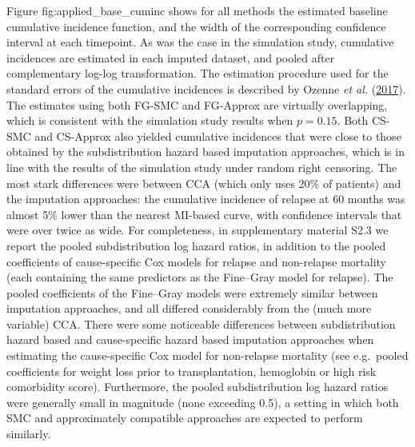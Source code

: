 \documentclass[
  letterpaper,
  DIV=11,
  numbers=noendperiod]{scrreprt}
\begin{document}
Figure fig:applied\_base\_cuminc shows for all methods the estimated
baseline cumulative incidence function, and the width of the
corresponding confidence interval at each timepoint. As was the case in
the simulation study, cumulative incidences are estimated in each
imputed dataset, and pooled after complementary log-log transformation.
The estimation procedure used for the standard errors of the cumulative
incidences is described by Ozenne \emph{et al.}
(\protect\hyperlink{ref-RJ-2017-062}{2017}). The estimates using both
FG-SMC and FG-Approx are virtually overlapping, which is consistent with
the simulation study results when \(p = 0.15\). Both CS-SMC and
CS-Approx also yielded cumulative incidences that were close to those
obtained by the subdistribution hazard based imputation approaches,
which is in line with the results of the simulation study under random
right censoring. The most stark differences were between CCA (which only
uses 20\% of patients) and the imputation approaches: the cumulative
incidence of relapse at 60 months was almost 5\% lower than the nearest
MI-based curve, with confidence intervals that were over twice as wide.
For completeness, in supplementary material S2.3 we report the pooled
subdistribution log hazard ratios, in addition to the pooled
coefficients of cause-specific Cox models for relapse and non-relapse
mortality (each containing the same predictors as the Fine--Gray model
for relapse). The pooled coefficients of the Fine--Gray models were
extremely similar between imputation approaches, and all differed
considerably from the (much more variable) CCA. There were some
noticeable differences between subdistribution hazard based and
cause-specific hazard based imputation approaches when estimating the
cause-specific Cox model for non-relapse mortality (see e.g.~pooled
coefficients for weight loss prior to transplantation, hemoglobin or
high risk comorbidity score). Furthermore, the pooled subdistribution
log hazard ratios were generally small in magnitude (none exceeding
0.5), a setting in which both SMC and approximately compatible
approaches are expected to perform similarly.
\end{document}
